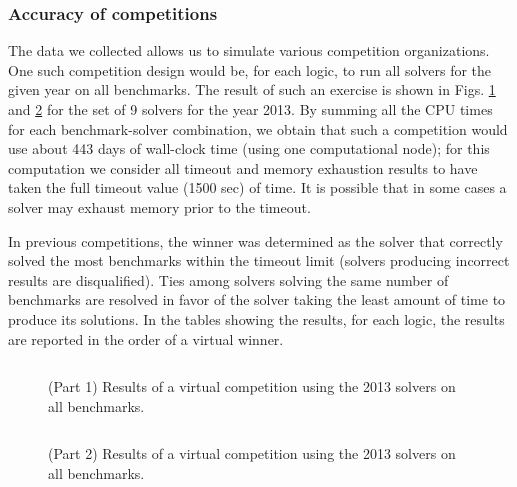 \documentclass[smallcondensed]{svjour3}
\begin{document}
\subsubsection{Accuracy of competitions}
\label{BenchmarkSelection}
The data we collected allows us to simulate various competition organizations. One such competition design would be, for each logic, to run all solvers for the given year on all benchmarks. The result of such an exercise is shown in Figs. \ref{Fig:virtual-competition-all} and \ref{Fig:virtual-competition-all2} for the set of 9 solvers for the year 2013. By summing all the CPU times for each benchmark-solver combination, we obtain that such a competition would use about 443 days of wall-clock time (using one computational node); for this computation we consider all timeout and memory exhaustion results to have taken the full timeout value (1500 sec) of time. It is possible that in some cases a solver may exhaust memory prior to the timeout.

In previous competitions, the winner was determined as the solver that correctly solved the most benchmarks within the timeout limit (solvers producing incorrect results are disqualified). Ties among solvers solving the same number of benchmarks are resolved in favor of the solver taking the least amount of time to produce its solutions. In the tables showing the results, for each logic, the results are reported in the order of a virtual winner.

\begin{figure}
\centering
\begin{tabular}{|p{.01in}rrl|}
\hline

\end{tabular}
\caption{(Part 1) Results of a virtual competition using the 2013 solvers on all benchmarks.}
\label{Fig:virtual-competition-all}
\end{figure}

\begin{figure}
\centering
\begin{tabular}{|p{.01in}rrl|}
\hline

\end{tabular}
\caption{(Part 2) Results of a virtual competition using the 2013 solvers on all benchmarks.}
\label{Fig:virtual-competition-all2}
\end{figure}

%
\end{document}
